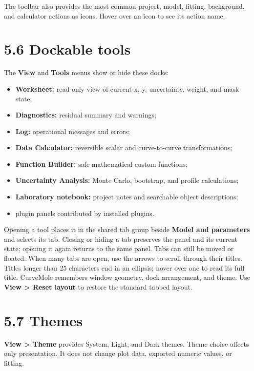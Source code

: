\documentclass[
  10pt,
  a4paper,
  oneside]{scrreprt}
\providecommand{\tightlist}{%
  \setlength{\itemsep}{0pt}\setlength{\parskip}{0pt}}
\begin{document}
The toolbar also provides the most common project, model, fitting,
background, and calculator actions as icons. Hover over an icon to see
its action name.

\hypertarget{dockable-tools}{%
\section{5.6 Dockable tools}\label{dockable-tools}}

The \textbf{View} and \textbf{Tools} menus show or hide these docks:

\begin{itemize}
\tightlist
\item
  \textbf{Worksheet:} read-only view of current x, y, uncertainty,
  weight, and mask state;
\item
  \textbf{Diagnostics:} residual summary and warnings;
\item
  \textbf{Log:} operational messages and errors;
\item
  \textbf{Data Calculator:} reversible scalar and curve-to-curve
  transformations;
\item
  \textbf{Function Builder:} safe mathematical custom functions;
\item
  \textbf{Uncertainty Analysis:} Monte Carlo, bootstrap, and profile
  calculations;
\item
  \textbf{Laboratory notebook:} project notes and searchable object
  descriptions;
\item
  plugin panels contributed by installed plugins.
\end{itemize}

Opening a tool places it in the shared tab group beside \textbf{Model
and parameters} and selects its tab. Closing or hiding a tab preserves
the panel and its current state; opening it again returns to the same
panel. Tabs can still be moved or floated. When many tabs are open, use
the arrows to scroll through their titles. Titles longer than 25
characters end in an ellipsis; hover over one to read its full title.
CurveMole remembers window geometry, dock arrangement, and theme. Use
\textbf{View \textgreater{} Reset layout} to restore the standard tabbed
layout.

\hypertarget{themes}{%
\section{5.7 Themes}\label{themes}}

\textbf{View \textgreater{} Theme} provides System, Light, and Dark
themes. Theme choice affects only presentation. It does not change plot
data, exported numeric values, or fitting.
\end{document}
